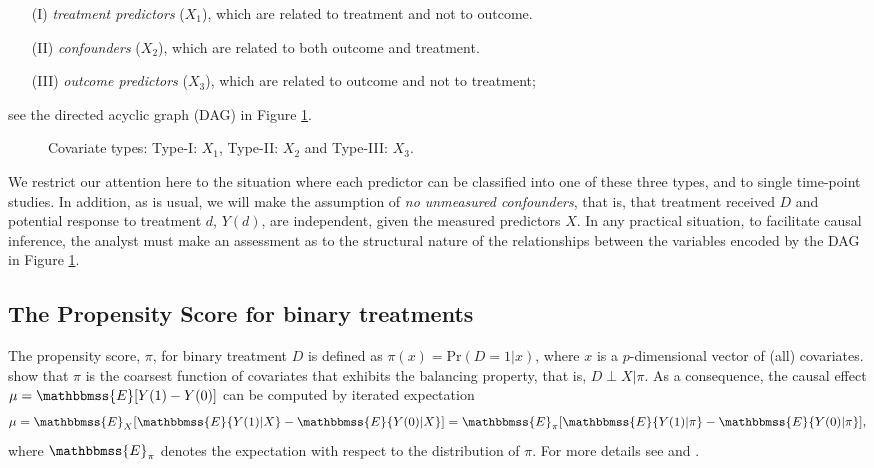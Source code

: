 \documentclass[11pt]{statsoc}
\begin{document}
\begin{itemize}

\item[(I)] \textit{treatment predictors} ($X_1$), which are related to treatment and not to outcome.

\item[(II)] \textit{confounders} ($X_2$), which are related to both outcome and treatment.

\item[(III)] \textit{outcome predictors} ($X_3$), which are related to outcome and not to treatment;
\end{itemize}
see the directed acyclic graph (DAG) in Figure \ref{fig:2conf}.
\begin{figure}[t]
\vspace{0.4 in}
\caption{ Covariate types: Type-I: $X_1$, Type-II: $X_2$ and Type-III: $X_3$.}
\vspace{0.4 in}
\centerline{
}
\label{fig:2conf}
\end{figure}
We restrict our attention here to the situation where each predictor can be classified into one of these three types, and to single time-point studies. In addition, as is usual, we will make the assumption of \textit{no unmeasured confounders}, that is, that treatment received $D$ and potential response to treatment $d$, $Y(d)$, are independent, given the measured predictors $X$.  In any practical situation, to facilitate causal inference, the analyst must make an assessment as to the structural nature of the relationships between the variables encoded by the DAG in Figure \ref{fig:2conf}.

\subsection{The Propensity Score for binary treatments}

The propensity score, $\pi$, for binary treatment $D$ is defined as $\pi(x) =
{\text{Pr}}(D=1|x)$, where $x$ is a $p$-dimensional vector of (all) covariates.
\cite{rosenbaum1983central} show that $\pi$ is the coarsest function of
covariates that exhibits the balancing property, that is, $D \perp X
| \pi $. As a consequence, the causal effect $\mu = {\mathbbmss{E}}[Y(1)-Y(0)]$ can be
computed by iterated expectation
\begin{equation}
\mu = {\mathbbmss{E}}_{X}[{\mathbbmss{E}}\{Y(1)|X\}-{\mathbbmss{E}}\{Y(0)|X\}] = {\mathbbmss{E}}_{\pi}[{\mathbbmss{E}}\{Y(1)|\pi\}-{\mathbbmss{E}}\{Y(0)|\pi\}],
\label{eq:ATE}
\end{equation}
where ${\mathbbmss{E}}_{\pi}$ denotes the expectation with respect to the
distribution of $\pi$. For more details see \cite{rubin2008objective} and
\cite{rosenbaum2010causal}.
\end{document}
